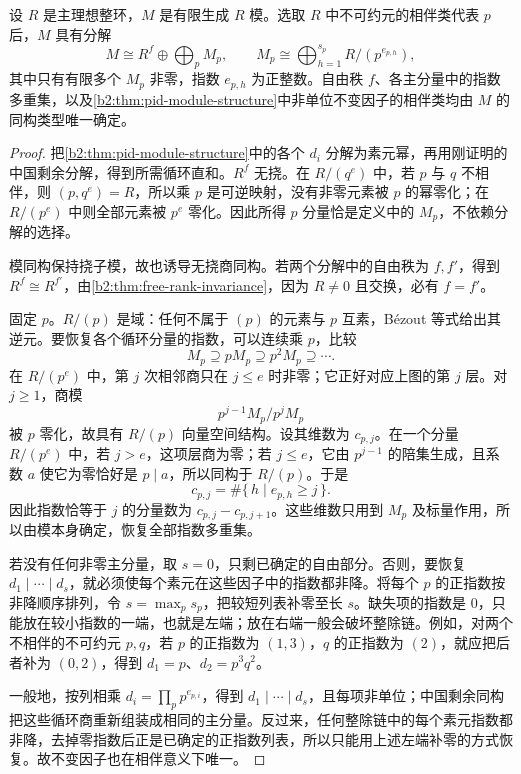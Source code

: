 \begin{theorem}[初等因子及分类唯一性]\label{b2:thm:pid-elementary-divisors}
	设 \(R\) 是主理想整环，\(M\) 是有限生成 \(R\) 模。选取 \(R\) 中不可约元的相伴类代表 \(p\) 后，\(M\) 具有分解
	\[
		M\cong R^f\oplus\bigoplus_p M_p, \qquad M_p\cong\bigoplus_{h=1}^{s_p}R/(p^{e_{p,h}}),
	\]
	其中只有有限多个 \(M_p\) 非零，指数 \(e_{p,h}\) 为正整数。自由秩 \(f\)、各主分量中的指数多重集，以及\cref{b2:thm:pid-module-structure}中非单位不变因子的相伴类均由 \(M\) 的同构类型唯一确定。
\end{theorem}
\begin{proof}
	把\cref{b2:thm:pid-module-structure}中的各个 \(d_i\) 分解为素元幂，再用刚证明的中国剩余分解，得到所需循环直和。\(R^f\) 无挠。在 \(R/(q^e)\) 中，若 \(p\) 与 \(q\) 不相伴，则 \((p,q^e)=R\)，所以乘 \(p\) 是可逆映射，没有非零元素被 \(p\) 的幂零化；在 \(R/(p^e)\) 中则全部元素被 \(p^e\) 零化。因此所得 \(p\) 分量恰是定义中的 \(M_p\)，不依赖分解的选择。

	模同构保持挠子模，故也诱导无挠商同构。若两个分解中的自由秩为 \(f,f'\)，得到 \(R^f\cong R^{f'}\)，由\cref{b2:thm:free-rank-invariance}，因为 \(R\ne0\) 且交换，必有 \(f=f'\)。

	固定 \(p\)。\(R/(p)\) 是域：任何不属于 \((p)\) 的元素与 \(p\) 互素，Bézout 等式给出其逆元。要恢复各个循环分量的指数，可以连续乘 \(p\)，比较
	\[
		M_p\supseteq pM_p\supseteq p^2M_p\supseteq\cdots.
	\]
	在 \(R/(p^e)\) 中，第 \(j\) 次相邻商只在 \(j\le e\) 时非零；它正好对应上图的第 \(j\) 层。对 \(j\ge1\)，商模
	\[
		p^{j-1}M_p/p^jM_p
	\]
	被 \(p\) 零化，故具有 \(R/(p)\) 向量空间结构。设其维数为 \(c_{p,j}\)。在一个分量 \(R/(p^e)\) 中，若 \(j>e\)，这项层商为零；若 \(j\le e\)，它由 \(p^{j-1}\) 的陪集生成，且系数 \(a\) 使它为零恰好是 \(p\mid a\)，所以同构于 \(R/(p)\)。于是
	\[
		c_{p,j}=\#\{\,h\mid e_{p,h}\ge j\,\}.
	\]
	因此指数恰等于 \(j\) 的分量数为 \(c_{p,j}-c_{p,j+1}\)。这些维数只用到 \(M_p\) 及标量作用，所以由模本身确定，恢复全部指数多重集。

	若没有任何非零主分量，取 \(s=0\)，只剩已确定的自由部分。否则，要恢复 \(d_1\mid\cdots\mid d_s\)，就必须使每个素元在这些因子中的指数都非降。将每个 \(p\) 的正指数按非降顺序排列，令 \(s=\max_p s_p\)，把较短列表补零至长 \(s\)。缺失项的指数是 \(0\)，只能放在较小指数的一端，也就是左端；放在右端一般会破坏整除链。例如，对两个不相伴的不可约元 \(p,q\)，若 \(p\) 的正指数为 \((1,3)\)，\(q\) 的正指数为 \((2)\)，就应把后者补为 \((0,2)\)，得到 \(d_1=p\)、\(d_2=p^3q^2\)。

	一般地，按列相乘 \(d_i=\prod_p p^{e_{p,i}}\)，得到 \(d_1\mid\cdots\mid d_s\)，且每项非单位；中国剩余同构把这些循环商重新组装成相同的主分量。反过来，任何整除链中的每个素元指数都非降，去掉零指数后正是已确定的正指数列表，所以只能用上述左端补零的方式恢复。故不变因子也在相伴意义下唯一。
\end{proof}
